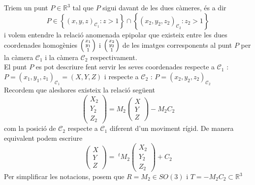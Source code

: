 \documentclass[a4paper,12pt]{article}
\begin{document}
	Triem un punt $P \in \mathbb{R}^3$ tal que $P$ sigui davant de les dues càmeres, és a dir
	\begin{displaymath}
		P \in \left\{(x,y,z)_{\mathcal{C}_1} : z > 1 \right\}\cap\left\{(x_2,y_2,z_2)_{\mathcal{C}_2} : z_2 > 1 \right\}
	\end{displaymath}
	i volem entendre la relació anomenada epipolar que existeix entre les dues coordenades homogènies $\begin{psmallmatrix}x_1\\y_1\\1\end{psmallmatrix}$ i $\begin{psmallmatrix}x_2\\y_2\\1\end{psmallmatrix}$ de les imatges corresponents al punt $P$ per la càmera $\mathcal{C}_1$ i la càmera $\mathcal{C}_2$ respectivament.\\
	El punt $P$ es pot descriure fent servir les seves coordenades respecte a $\mathcal{C}_1$ : $P = (x_1, y_1, z_1)_{\mathcal{C}_1} = (X,Y,Z)$ i respecte a $\mathcal{C}_2$ : $P = (x_2, y_2, z_2)_{\mathcal{C}_2}$\\
	Recordem que aleshores existeix la relació següent
	\begin{displaymath}
		\begin{pmatrix}
			X_2\\Y_2\\Z_2
		\end{pmatrix} =
		M_2 \begin{pmatrix}
			X\\Y\\Z
			\end{pmatrix}
		- M_2C_2
	\end{displaymath}
	com la posició de $\mathcal{C}_2$ respecte a $\mathcal{C}_1$ diferent d'un moviment rígid. De manera equivalent podem escriure
	\begin{displaymath}
	\begin{pmatrix}
		X\\Y\\Z
	\end{pmatrix} =
	\;^tM_2 \begin{pmatrix}
		X_2\\Y_2\\Z_2
		\end{pmatrix}
	+ C_2
	\end{displaymath}
	Per simplificar les notacions, posem que $R = M_2 \in SO(3)$ i $T = -M_2C_2 \subset \mathbb{R}^3$
\end{document}
